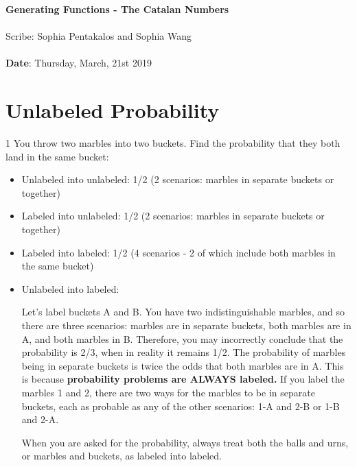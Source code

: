 \documentclass[11pt,twosided]{article}
\def\titlestring{Generating Functions - The Catalan Numbers}
\def\scribestring{Sophia Pentakalos and Sophia Wang}
\def\datestring{Thursday, March, 21st 2019}
\begin{document}
\thispagestyle{plain}  %

\noindent
{\LARGE \textbf{\titlestring}}\\\\
%
{\Large Scribe: \scribestring}\\ \\
{\textbf{Date}: \datestring}


\noindent

\section{Unlabeled Probability}

\begin{problem}
1 You throw two marbles into two buckets. Find the probability that they both land in the same bucket: 

\begin{itemize}
    \item Unlabeled into unlabeled:  1/2 (2 scenarios: marbles in separate buckets or together)
    \item Labeled into unlabeled: 1/2 (2 scenarios: marbles in separate buckets or together)
    \item Labeled into labeled: 1/2 (4 scenarios - 2 of which include both marbles in the same bucket)
    
    \item Unlabeled into labeled: 
    
    Let's label buckets A and B. You have two indistinguishable marbles, and so there are three scenarios: marbles are in separate buckets, both marbles are in A, and both marbles in B. Therefore, you may incorrectly conclude that the probability is 2/3, when in reality it remains 1/2. The probability of marbles being in separate buckets is twice the odds that both marbles are in A. 
    \newline \newline
    This is because \textbf{probability problems are ALWAYS labeled.}
    \newline \newline
    If you label the marbles 1 and 2, there are two ways for the marbles to be in separate buckets, each as probable as any of the other scenarios: 1-A and 2-B or 1-B and 2-A. 
    
    When you are asked for the probability, always treat both the balls and urns, or marbles and buckets, as labeled into labeled. 

\end{itemize}

\end{problem}
\end{document}
